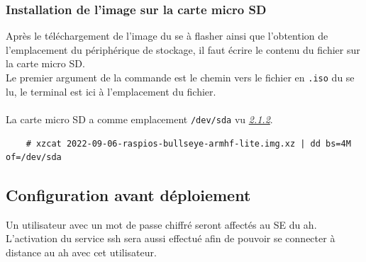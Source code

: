 \documentclass[a4paper]{article}
\begin{document}
\subsubsection{Installation de l'image sur la carte micro SD}
Après le téléchargement de l'image du \acrshort{se} à flasher ainsi que l'obtention de l'emplacement du périphérique de stockage, il faut écrire le contenu du fichier sur la carte micro SD.\\Le premier argument de la commande est le chemin vers le fichier en \verb|.iso| du \acrshort{se} lu, le terminal est ici à l'emplacement du fichier.\\\\La carte micro SD a comme emplacement \verb|/dev/sda| vu \hyperref[sec:sec01]{\textit{2.1.2}}.
\begin{lstlisting}
    # xzcat 2022-09-06-raspios-bullseye-armhf-lite.img.xz | dd bs=4M of=/dev/sda
\end{lstlisting}
\subsection{Configuration avant déploiement}
Un utilisateur avec un mot de passe chiffré seront affectés au SE du \acrshort{ah}. L'activation du service \gls{ssh} sera aussi effectué afin de pouvoir se connecter à distance au \acrshort{ah} avec cet utilisateur.
\end{document}
